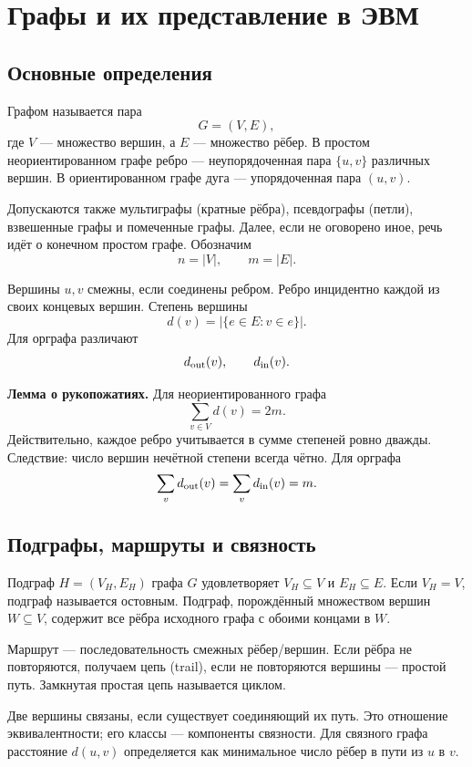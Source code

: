 \section{Графы и их представление в ЭВМ}
\label{sec:graphs-representation}

\subsection{Основные определения}

Графом называется пара
\[
 G=(V,E),
\]
где $V$ --- множество вершин, а $E$ --- множество рёбер. В простом
неориентированном графе ребро --- неупорядоченная пара $\{u,v\}$ различных
вершин. В ориентированном графе дуга --- упорядоченная пара $(u,v)$.

Допускаются также мультиграфы (кратные рёбра), псевдографы (петли), взвешенные
графы и помеченные графы. Далее, если не оговорено иное, речь идёт о конечном
простом графе. Обозначим
\[
 n=|V|,\qquad m=|E|.
\]

Вершины $u,v$ смежны, если соединены ребром. Ребро инцидентно каждой из своих
концевых вершин. Степень вершины
\[
 d(v)=|\{e\in E: v\in e\}|.
\]
Для орграфа различают
\[
 d_{\rm out}(v),\qquad d_{\rm in}(v).
\]

\textbf{Лемма о рукопожатиях.}
Для неориентированного графа
\[
 \sum_{v\in V}d(v)=2m.
\]
Действительно, каждое ребро учитывается в сумме степеней ровно дважды. Следствие:
число вершин нечётной степени всегда чётно.
Для орграфа
\[
 \sum_v d_{\rm out}(v)=\sum_v d_{\rm in}(v)=m.
\]

\subsection{Подграфы, маршруты и связность}

Подграф $H=(V_H,E_H)$ графа $G$ удовлетворяет $V_H\subseteq V$ и
$E_H\subseteq E$. Если $V_H=V$, подграф называется остовным. Подграф,
порождённый множеством вершин $W\subseteq V$, содержит все рёбра исходного графа
с обоими концами в $W$.

Маршрут --- последовательность смежных рёбер/вершин. Если рёбра не повторяются,
получаем цепь (trail), если не повторяются вершины --- простой путь. Замкнутая
простая цепь называется циклом.

Две вершины связаны, если существует соединяющий их путь. Это отношение
эквивалентности; его классы --- компоненты связности. Для связного графа расстояние
$d(u,v)$ определяется как минимальное число рёбер в пути из $u$ в $v$.

